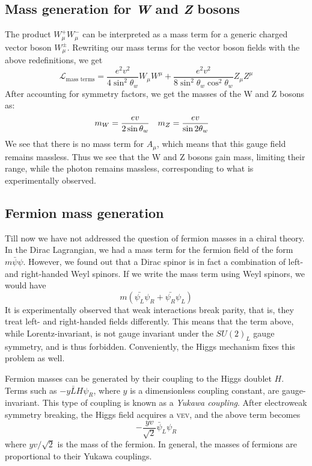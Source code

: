 \subsection{Mass generation for \emph{W} and \emph{Z} bosons}
The product $W_\mu^+W_\mu^-$ can be interpreted as a mass term for a generic charged vector boson $W_\mu^\pm$. Rewriting our mass terms for the vector boson fields with the above redefinitions, we get
\[\mathcal{L}_{\text{mass terms}}=\frac{e^2v^2}{4\sin^2\theta_w}W_\mu W^\mu+
\frac{e^2v^2}{8\sin^2\theta_w\cos^2\theta_w}Z_\mu Z^\mu\]
After accounting for symmetry factors, we get the masses of the W and Z bosons as:
\begin{align*}
  m_W &=\frac{ev}{2\sin\theta_w} & 
  m_Z &=\frac{ev}{\sin2\theta_w}
\end{align*}
We see that there is no mass term for $A_\mu$, which means that this gauge field remains massless. Thus we see that the W and Z bosons gain mass, limiting their range, while the photon remains massless, corresponding to what is experimentally observed. 

\subsection{Fermion mass generation}

Till now we have not addressed the question of fermion masses in a chiral theory. In the Dirac Lagrangian, we had a mass term for the fermion field of the form $m\bar{\psi}\psi$. However, we found out that a Dirac spinor is in fact a combination of left- and right-handed Weyl spinors. If we write the mass term using Weyl spinors, we would have
$$m(\bar{\psi_L}\psi_R+\bar{\psi_R}\psi_L)$$
It is experimentally observed that weak interactions break parity, that is, they treat left- and right-handed fields differently. This means that the term above, while Lorentz-invariant, is not gauge invariant under the $SU(2)_L$ gauge symmetry, and is thus forbidden. Conveniently, the Higgs mechanism fixes this problem as well.

Fermion masses can be generated by their coupling to the Higgs doublet $H$. Terms such as $-y\bar{L}H\psi_R$, where $y$ is a dimensionless coupling constant, are gauge-invariant. This type of coupling is known as a \emph{Yukawa coupling}. After electroweak symmetry breaking, the Higgs field acquires a \textsc{vev}, and the above term becomes
\begin{equation}\label{eq:fermion_masses}
-\frac{yv}{\sqrt{2}}\bar{\psi}_L\psi_R
\end{equation}
where $yv/\sqrt{2}$ is the mass of the fermion. In general, the masses of fermions are proportional to their Yukawa couplings.

